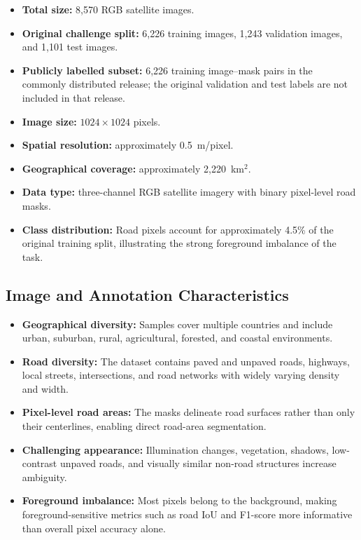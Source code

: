 \documentclass[11pt,a4paper]{article}
\begin{document}
\begin{itemize}
  \item \textbf{Total size:} 8,570 RGB satellite images.
  \item \textbf{Original challenge split:} 6,226 training images, 1,243
        validation images, and 1,101 test images.
  \item \textbf{Publicly labelled subset:} 6,226 training image--mask pairs in
        the commonly distributed release; the original validation and test
        labels are not included in that release.
  \item \textbf{Image size:} $1024\times1024$ pixels.
  \item \textbf{Spatial resolution:} approximately 0.5~m/pixel.
  \item \textbf{Geographical coverage:} approximately 2,220~km$^2$.
  \item \textbf{Data type:} three-channel RGB satellite imagery with binary
        pixel-level road masks.
  \item \textbf{Class distribution:} Road pixels account for approximately
        4.5\% of the original training split, illustrating the strong foreground
        imbalance of the task.
\end{itemize}

\subsection{Image and Annotation Characteristics}

\begin{itemize}
  \item \textbf{Geographical diversity:} Samples cover multiple countries and
        include urban, suburban, rural, agricultural, forested, and coastal
        environments.
  \item \textbf{Road diversity:} The dataset contains paved and unpaved roads,
        highways, local streets, intersections, and road networks with widely
        varying density and width.
  \item \textbf{Pixel-level road areas:} The masks delineate road surfaces rather
        than only their centerlines, enabling direct road-area segmentation.
  \item \textbf{Challenging appearance:} Illumination changes, vegetation,
        shadows, low-contrast unpaved roads, and visually similar non-road
        structures increase ambiguity.
  \item \textbf{Foreground imbalance:} Most pixels belong to the background,
        making foreground-sensitive metrics such as road IoU and F1-score more
        informative than overall pixel accuracy alone.
\end{itemize}
\end{document}
